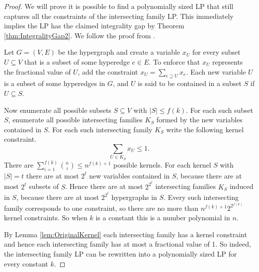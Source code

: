 \begin{proof}
We will prove it is possible to find a polynomially sized LP that still captures all the constraints of the intersecting family LP. This immediately implies the LP has the claimed integrality gap by Theorem \ref{thm:IntegralityGap2}. We follow the proof from \cite{LapChiLau}.

Let $G = (V,E)$ be the hypergraph and create a variable $x_U$ for every subset $U \subseteq V$ that is a subset of some hyperedge $e \in E$. To enforce that $x_U$ represents the fractional value of $U$, add the constraint $x_U = \sum_{e \supseteq U} x_e$. Each new variable $U$ is a subset of some hyperedges in $G$, and $U$ is said to be contained in a subset $S$ if $U \subseteq S$.

Now enumerate all possible subsets $S \subseteq V$ with $|S| \leq f(k)$. For each such subset $S$, enumerate all possible intersecting families $K_S$ formed by the new variables contained in $S$. For each such intersecting family $K_S$ write the following kernel constraint.
%
\begin{equation*}
\sum_{U \in K_S} x_U \leq 1.
\end{equation*}
%
There are $\sum_{i=1}^{f(k)} {n \choose i} \leq n^{f(k) + 1}$ possible kernels. For each kernel $S$ with $|S| = t$ there are at most $2^t$ new variables contained in $S$, because there are at most $2^t$ subsets of $S$. Hence there are at most $2^{2^t}$ intersecting families $K_S$ induced in $S$, because there are at most $2^{2^t}$ hypergraphs in $S$. Every such intersecting family corresponds to one constraint, so there are no more than $n^{f(k)+1} 2^{2^{f(k)}}$ kernel constraints. So when $k$ is a constant this is a number polynomial in $n$.

By Lemma \ref{lem:OriginalKernel} each intersecting family has a kernel constraint and hence each intersecting family has at most a fractional value of 1. So indeed, the intersecting family LP can be rewritten into a polynomially sized LP for every constant $k$.
\end{proof} 